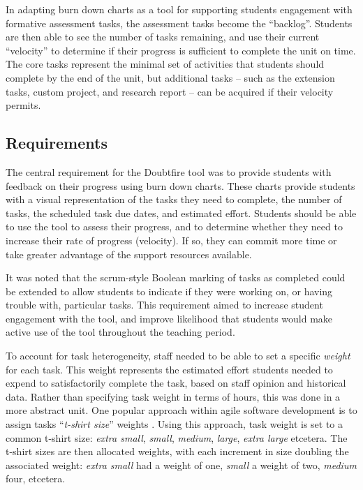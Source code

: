 In adapting burn down charts as a tool for supporting students engagement with formative assessment tasks, the assessment tasks become the ``backlog''. Students are then able to see the number of tasks remaining, and use their current ``velocity'' to determine if their progress is sufficient to complete the unit on time. The core tasks represent the minimal set of activities that students should complete by the end of the unit, but additional tasks -- such as the extension tasks, custom project, and research report -- can be acquired if their velocity permits.


\subsection{Requirements} %
\label{sub:doubtfire_requirements}

The central requirement for the Doubtfire tool was to provide students with feedback on their progress using burn down charts. These charts provide students with a visual representation of the tasks they need to complete, the number of tasks, the scheduled task due dates, and estimated effort. Students should be able to use the tool to assess their progress, and to determine whether they need to increase their rate of progress (velocity). If so, they can commit more time or take greater advantage of the support resources available. 

It was noted that the scrum-style Boolean marking of tasks as completed could be extended to allow students to indicate if they were working on, or having trouble with, particular tasks. This requirement aimed to increase student engagement with the tool, and improve likelihood that students would make active use of the tool throughout the teaching period.

To account for task heterogeneity, staff needed to be able to set a specific \emph{weight} for each task. This weight represents the estimated effort students needed to expend to satisfactorily complete the task, based on staff opinion and historical data. Rather than specifying task weight in terms of hours, this was done in a more abstract unit. One popular approach within agile software development is to assign tasks ``\emph{t-shirt size}'' weights \cite{Peixoto:2010}. Using this approach, task weight is set to a common t-shirt size: \emph{extra small}, \emph{small}, \emph{medium}, \emph{large}, \emph{extra large} etcetera. The t-shirt sizes are then allocated weights, with each increment in size doubling the associated weight: \emph{extra small} had a weight of one, \emph{small} a weight of two, \emph{medium} four, etcetera.

